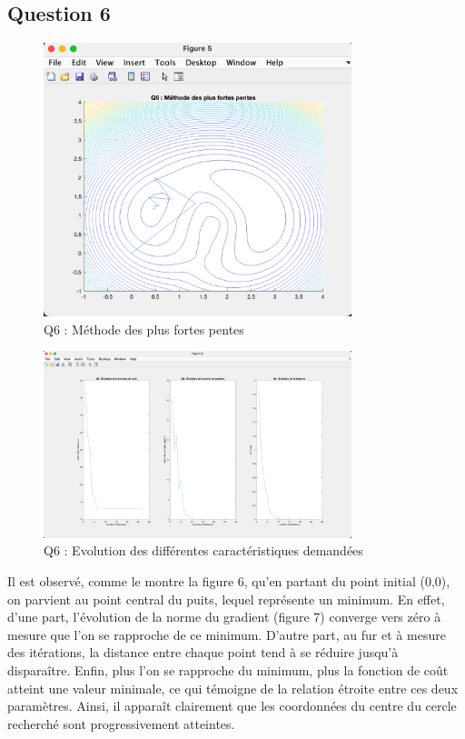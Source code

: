 \documentclass[12pt]{article}
\begin{document}
\subsection{Question 6}
\begin{figure}[H]
    \centering
    \includegraphics[width=0.8\textwidth]{Q6.1.png} 
    \caption{Q6 : Méthode des plus fortes pentes}
\end{figure}
\begin{figure}[H]
    \centering
    \includegraphics[width=0.8\textwidth]{Q6.2.png} 
    \caption{Q6 : Evolution des différentes caractéristiques demandées}
\end{figure}
Il est observé, comme le montre la figure 6, qu’en partant du point initial (0,0), on parvient au point central du puits, lequel représente un minimum. En effet, d’une part, l’évolution de la norme du gradient (figure 7) converge vers zéro à mesure que l’on se rapproche de ce minimum. D’autre part, au fur et à mesure des itérations, la distance entre chaque point tend à se réduire jusqu’à disparaître. Enfin, plus l’on se rapproche du minimum, plus la fonction de coût atteint une valeur minimale, ce qui témoigne de la relation étroite entre ces deux paramètres. Ainsi, il apparaît clairement que les coordonnées du centre du cercle recherché sont progressivement atteintes. 
\end{document}
